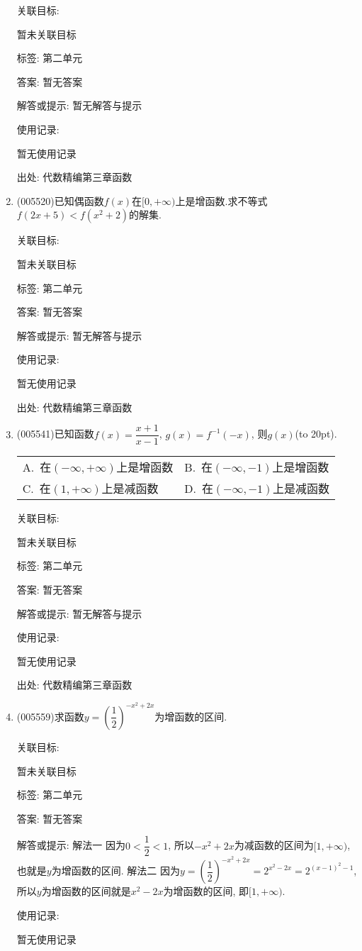 \documentclass[10pt,a4paper]{article}
\newcommand{\bracket}[1]{(\hbox to #1pt{})}
\newcommand{\twoch}[4]{\par\begin{tabular}{p{.46\textwidth}p{.46\textwidth}}
A.~#1& B.~#2\\
C.~#3& D.~#4
\end{tabular}}
\begin{document}
\begin{enumerate}[1.]
关联目标:

暂未关联目标



标签: 第二单元

答案: 暂无答案

解答或提示: 暂无解答与提示

使用记录:

暂无使用记录


出处: 代数精编第三章函数
\item { (005520)}已知偶函数$f(x)$在$[0,+\infty)$上是增函数.求不等式$f(2x+5)<f(x^2+2)$的解集.


关联目标:

暂未关联目标



标签: 第二单元

答案: 暂无答案

解答或提示: 暂无解答与提示

使用记录:

暂无使用记录


出处: 代数精编第三章函数
\item { (005541)}已知函数$f(x)=\dfrac{x+1}{x-1}$, $g(x)=f^{-1}(-x)$, 则$g(x)$\bracket{20}.
\twoch{在$(-\infty ,+\infty)$上是增函数}{在$(-\infty ,-1)$上是增函数}{在$(1,+\infty)$上是减函数}{在$(-\infty ,-1)$上是减函数}


关联目标:

暂未关联目标



标签: 第二单元

答案: 暂无答案

解答或提示: 暂无解答与提示

使用记录:

暂无使用记录


出处: 代数精编第三章函数
\item { (005559)}求函数$y=(\dfrac 12)^{-x^2+2x}$为增函数的区间.


关联目标:

暂未关联目标



标签: 第二单元

答案: 暂无答案

解答或提示: 解法一  因为$ 0<\dfrac 12<1$,
所以$-x^2+2x$为减函数的区间为$[1,+\infty)$, 也就是$y$为增函数的区间.
解法二  因为$y=(\dfrac 12)^{-x^2+2x}=2^{x^2-2x}=2^{(x-1)^2-1}$,
所以$y$为增函数的区间就是$x^2-2x$为增函数的区间, 即$[1,+\infty)$.

使用记录:

暂无使用记录



\end{enumerate}
\end{document}
